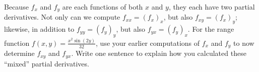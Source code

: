 \begin{pa}

  \item Because $f_x$ and $f_y$ are each functions of both $x$ and $y$, they each have two partial derivatives.  Not only can we compute $f_{xx} = (f_x)_x$, but also $f_{xy} = (f_x)_y$; likewise, in addition to $f_{yy} = (f_y)_y$, but also $f_{yx} = (f_y)_x$.  For the range function $f(x,y) = \frac{x^2\sin(2y)}{32}$, use your earlier computations of $f_x$ and $f_y$ to now determine $f_{xy}$ and $f_{yx}$.  Write one sentence to explain how you calculated these ``mixed'' partial derivatives.

    \ea


\end{pa} 

